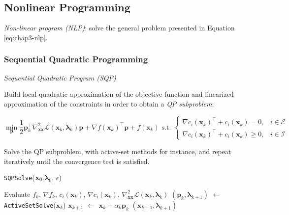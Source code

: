 \subsection{Nonlinear Programming}

\emph{Non-linear program (NLP)}: solve the general problem presented
in Equation \ref{eq:chap3-nlp}.

\subsubsection{Sequential Quadratic Programming}

\emph{Sequential Quadratic Program (SQP)}

Build local quadratic approximation of the objective function and
linearized approximation of the constraints in order to obtain a
\emph{QP subproblem}:

\begin{equation}
\min_{\mathbf{p}}\frac{1}{2}\mathbf{p}_k^{\top}\nabla_{\mathbf{x}\mathbf{x}}^2\mathcal{L}(\mathbf{x}_k,\boldsymbol{\lambda}_k)\mathbf{p}+\nabla f(\mathbf{x}_k)^{\top}\mathbf{p}+f(\mathbf{x}_k)
\text{ s.t. }
\left\{\begin{array}{cc}
\nabla c_i(\mathbf{x}_k)^{\top}+c_i(\mathbf{x}_k) = 0, & i \in \mathcal{E} \\
\nabla c_i(\mathbf{x}_k)^{\top}+c_i(\mathbf{x}_k) \ge 0, & i \in \mathcal{I}
\end{array}\right.
\end{equation}

Solve the QP subproblem, with active-set methods for instance, and
repeat iteratively until the convergence test is satisfied.

\begin{algorithm}
\caption{\texttt{SQPSolve}($\mathbf{x}_0$,$\boldsymbol{\lambda}_0$, $\epsilon$)}
\label{alg:chap3-sqp}
\begin{algorithmic}
\STATE Evaluate $f_k$, $\nabla f_k$, $c_i(\mathbf{x}_k)$, $\nabla c_i(\mathbf{x}_k)$, $\nabla_{\mathbf{x}\mathbf{x}}^2\mathcal{L}(\mathbf{x}_k,\boldsymbol{\lambda}_k)$
\STATE $(\mathbf{p}_k, \boldsymbol{\lambda}_{k+1})$ $\leftarrow$ \texttt{ActiveSetSolve}($\mathbf{x}_k$)
\STATE $\mathbf{x}_{k+1}$ $\leftarrow$ $\mathbf{x}_k + \alpha_k\mathbf{p}_k$
\RETURN $(\mathbf{x}_{k+1},\boldsymbol{\lambda}_{k+1})$
\ENDIF
\ENDFOR
\end{algorithmic}
\end{algorithm}

